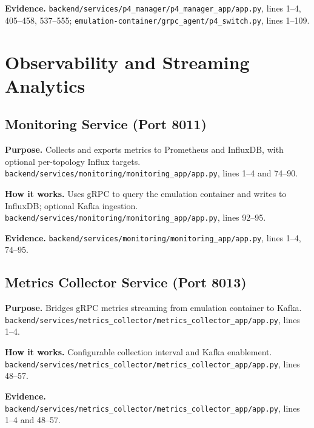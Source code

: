 \documentclass[10pt,a4paper]{article}
\begin{document}
\textbf{Evidence.} \texttt{backend/services/p4\_manager/p4\_manager\_app/app.py}, lines 1--4, 405--458, 537--555; \texttt{emulation-container/grpc\_agent/p4\_switch.py}, lines 1--109.

\section{Observability and Streaming Analytics}

\subsection{Monitoring Service (Port 8011)}

\textbf{Purpose.} Collects and exports metrics to Prometheus and InfluxDB, with optional per-topology Influx targets. \texttt{backend/services/monitoring/monitoring\_app/app.py}, lines 1--4 and 74--90.

\textbf{How it works.} Uses gRPC to query the emulation container and writes to InfluxDB; optional Kafka ingestion. \texttt{backend/services/monitoring/monitoring\_app/app.py}, lines 92--95.

\textbf{Evidence.} \texttt{backend/services/monitoring/monitoring\_app/app.py}, lines 1--4, 74--95.

\subsection{Metrics Collector Service (Port 8013)}

\textbf{Purpose.} Bridges gRPC metrics streaming from emulation container to Kafka. \texttt{backend/services/metrics\_collector/metrics\_collector\_app/app.py}, lines 1--4.

\textbf{How it works.} Configurable collection interval and Kafka enablement. \texttt{backend/services/metrics\_collector/metrics\_collector\_app/app.py}, lines 48--57.

\textbf{Evidence.} \texttt{backend/services/metrics\_collector/metrics\_collector\_app/app.py}, lines 1--4 and 48--57.

\end{document}
